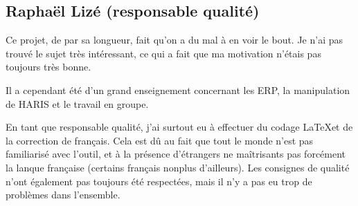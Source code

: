\subsection{Raphaël Lizé (responsable qualité)}

Ce projet, de par sa longueur, fait qu'on a du mal à en voir
le bout. Je n'ai pas trouvé le sujet très intéressant, ce qui
a fait que ma motivation n'étais pas toujours très bonne.

Il a cependant été d'un grand enseignement concernant les ERP,
la manipulation de HARIS et le travail en groupe.

En tant que responsable qualité, j'ai surtout eu à effectuer
du codage \LaTeX et de la correction de français. Cela est dû
au fait que tout le monde n'est pas familiarisé avec l'outil,
et à la présence d'étrangers ne maîtrisants pas forcément
la lanque française (certains français nonplus d'ailleurs).
Les consignes de qualité n'ont également pas toujours été respectées,
mais il n'y a pas eu trop de problèmes dans l'ensemble.
